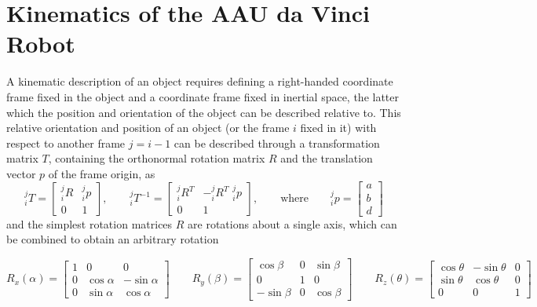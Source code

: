 \section{Kinematics of the AAU da Vinci Robot}
A kinematic description of an object requires defining a right-handed coordinate frame fixed in the object and a coordinate frame fixed in inertial space, the latter which the position and orientation of the object can be described relative to. This relative orientation and position of an object (or the frame $i$ fixed in it) with respect to another frame $j=i-1$ can be described through a transformation matrix $T$, containing the orthonormal rotation matrix $R$ and the translation vector $p$ of the frame origin, as 
\begin{equation}
^j_iT = 
\begin{bmatrix}
^j_iR & ^j_ip\\
0 & 1
\end{bmatrix}, \qquad
^j_iT^{-1} = 
\begin{bmatrix}
^j_iR^T & -^j_iR^T\,\,^j_ip\\
0 & 1
\end{bmatrix},
\qquad \text{where} \qquad
^j_ip = 
\begin{bmatrix}
a\\b\\d
\end{bmatrix}
\end{equation}
and the simplest rotation matrices $R$ are rotations about a single axis, which can be combined to obtain an arbitrary rotation
\begin{small}
	\begin{equation}
	R_x(\alpha) = 
	\begin{bmatrix}
	1 & 0 & 0\\
	0 & \cos\alpha & -\sin\alpha\\
	0 & \sin\alpha & \cos\alpha
	\end{bmatrix} 
	\qquad
	R_y(\beta) = 
	\begin{bmatrix}
	\cos\beta & 0 & \sin\beta \\
	0 & 1 & 0\\
	-\sin\beta & 0 & \cos\beta
	\end{bmatrix}
	\qquad
	R_z(\theta) = 
	\begin{bmatrix}
	\cos\theta & -\sin\theta & 0\\
	\sin\theta & \cos\theta & 0\\
	0 & 0 & 1
	\end{bmatrix}
	\label{eq:RxRyRz_chapter}
	\end{equation}
\end{small}

